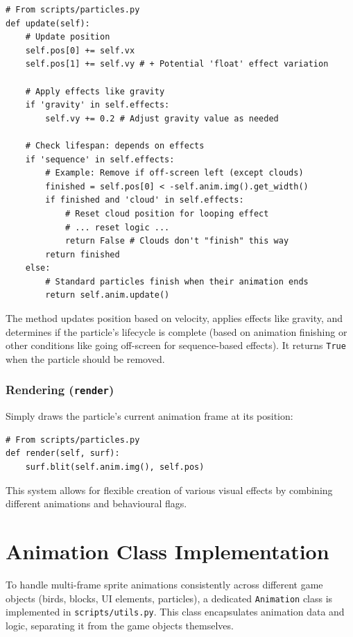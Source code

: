 \documentclass[11pt, a4paper]{article}
\begin{document}
\begin{lstlisting}[caption={Particle.update() Core Logic}, label={lst:particle_update_short}]
# From scripts/particles.py
def update(self):
    # Update position
    self.pos[0] += self.vx
    self.pos[1] += self.vy # + Potential 'float' effect variation

    # Apply effects like gravity
    if 'gravity' in self.effects:
        self.vy += 0.2 # Adjust gravity value as needed

    # Check lifespan: depends on effects
    if 'sequence' in self.effects:
        # Example: Remove if off-screen left (except clouds)
        finished = self.pos[0] < -self.anim.img().get_width()
        if finished and 'cloud' in self.effects:
            # Reset cloud position for looping effect
            # ... reset logic ...
            return False # Clouds don't "finish" this way
        return finished
    else:
        # Standard particles finish when their animation ends
        return self.anim.update()
\end{lstlisting}

The method updates position based on velocity, applies effects like gravity, and determines if the particle's lifecycle is complete (based on animation finishing or other conditions like going off-screen for sequence-based effects). It returns \texttt{True} when the particle should be removed.

\subsubsection{Rendering (\texttt{render})}

Simply draws the particle's current animation frame at its position:

\begin{lstlisting}[caption={Particle.render() Method}, label={lst:particle_render_short}]
# From scripts/particles.py
def render(self, surf):
    surf.blit(self.anim.img(), self.pos)
\end{lstlisting}

This system allows for flexible creation of various visual effects by combining different animations and behavioural flags.

\section{Animation Class Implementation}
\label{app:animation}

To handle multi-frame sprite animations consistently across different game objects (birds, blocks, UI elements, particles), a dedicated \texttt{Animation} class is implemented in \texttt{scripts/utils.py}. This class encapsulates animation data and logic, separating it from the game objects themselves.
\end{document}
